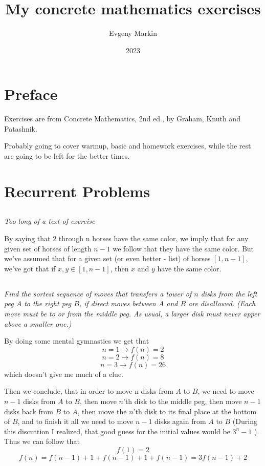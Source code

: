 \documentclass[11pt,oneside,titlepage]{book}
\title{My concrete mathematics exercises}
\author{Evgeny Markin}
\date{2023}
\begin{document}
\maketitle
\tableofcontents

\chapter*{Preface}

Exercises are from Concrete Mathematics, 2nd ed., by Graham, Knuth and Patashnik.

Probably going to cover warmup, basic and homework exercises, while the rest are
going to be left for the better times.

\chapter{Recurrent Problems}

\section{}

\textit{Too long of a text of exercise}

By saying that 2 through n horses have the same color, we imply that for any given
set of horses of length $n - 1$ we follow that they have the same color. But we've assumed
that for a given set (or even better - list) of horses $[1, n - 1]$, we've got that
if $x, y \in [1, n - 1]$, then $x$ and $y$ have the same color.

\section{}

\textit{Find the sortest sequence of moves that transfers a tower of $n$ disks from the
  left peg $A$ to the right peg $B$, if direct moves between $A$ and $B$ are disallowed. (Each
  move must be to or from the middle peg. As usual, a larger disk must never apper above
  a smaller one.)}

By doing some mental gymnastics we get that
$$n = 1 \to f(n) = 2$$
$$n = 2 \to f(n) = 8$$
$$n = 3 \to f(n) = 26$$
which doesn't give me much of a clue.

Then we conclude, that in order to move  n disks from $A$ to $B$, we need to move $n - 1$ disks
from $A$ to $B$, then move $n$'th disk to the middle peg, then move $n - 1$ disks back from $B$
to $A$, then move the $n$'th disk to its final place at the bottom of $B$, and to finish
it all we need to move $n - 1$ disks again from $A$ to $B$ (During this discuttion I realized,
that good guess for the initial values would be $3^n - 1$ ). Thus we can follow that
$$f(1) = 2$$
$$f(n) = f(n - 1) + 1 + f(n - 1) + 1 + f(n - 1) = 3f(n - 1) + 2$$
\end{document}
